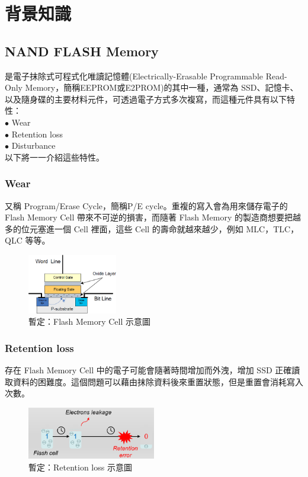 \chapter{背景知識}

\section{NAND FLASH Memory}\label{s2.1}
\indent
是電子抹除式可程式化唯讀記憶體(Electrically-Erasable Programmable Read-Only Memory，簡稱EEPROM或E2PROM)的其中一種，通常為 SSD、記憶卡、以及隨身碟的主要材料元件，可透過電子方式多次複寫，而這種元件具有以下特性：\\
$\bullet$ Wear \\
$\bullet$ Retention loss \\
$\bullet$ Disturbance \\
以下將一一介紹這些特性。

\subsection{Wear}\label{s2.1.1}
\indent
又稱 Program/Erase Cycle，簡稱P/E cycle。重複的寫入會為用來儲存電子的 Flash Memory Cell 帶來不可逆的損害，而隨著 Flash Memory 的製造商想要把越多的位元塞進一個 Cell 裡面，這些 Cell 的壽命就越來越少，例如 MLC，TLC，QLC 等等。
\begin{figure}[H]
    \centering
    \includegraphics[width=0.35\textwidth]{picture/ch2/wear.png}
    \caption{暫定：Flash Memory Cell 示意圖}
    \label{f2.1}
\end{figure}

\subsection{Retention loss}\label{s2.1.2}
\indent
存在 Flash Memory Cell 中的電子可能會隨著時間增加而外洩，增加 SSD 正確讀取資料的困難度。這個問題可以藉由抹除資料後來重置狀態，但是重置會消耗寫入次數。
\begin{figure}[H]
    \centering
    \includegraphics[width=0.5\textwidth]{picture/ch2/retention_loss.png}
    \caption{暫定：Retention loss 示意圖}
    \label{f2.2}
\end{figure}


